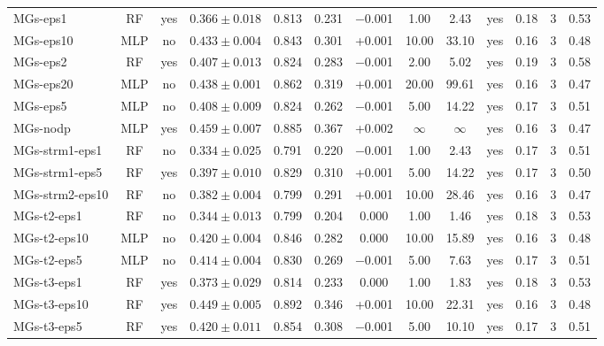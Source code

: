 \begin{landscape}
\begin{longtable}{lccccccccccc c}
MGs-eps1 & RF & yes & $0.366 \pm 0.018$ & 0.813 & 0.231 & $-$0.001 & 1.00 & 2.43 & yes & 0.18 & 3 & 0.53 \\
MGs-eps10 & MLP & no & $0.433 \pm 0.004$ & 0.843 & 0.301 & +0.001 & 10.00 & 33.10 & yes & 0.16 & 3 & 0.48 \\
MGs-eps2 & RF & yes & $0.407 \pm 0.013$ & 0.824 & 0.283 & $-$0.001 & 2.00 & 5.02 & yes & 0.19 & 3 & 0.58 \\
MGs-eps20 & MLP & no & $0.438 \pm 0.001$ & 0.862 & 0.319 & +0.001 & 20.00 & 99.61 & yes & 0.16 & 3 & 0.47 \\
MGs-eps5 & MLP & no & $0.408 \pm 0.009$ & 0.824 & 0.262 & $-$0.001 & 5.00 & 14.22 & yes & 0.17 & 3 & 0.51 \\
MGs-nodp & MLP & yes & $0.459 \pm 0.007$ & 0.885 & 0.367 & +0.002 & $\infty$ & $\infty$ & yes & 0.16 & 3 & 0.47 \\
MGs-strm1-eps1 & RF & no & $0.334 \pm 0.025$ & 0.791 & 0.220 & $-$0.001 & 1.00 & 2.43 & yes & 0.17 & 3 & 0.51 \\
MGs-strm1-eps5 & RF & yes & $0.397 \pm 0.010$ & 0.829 & 0.310 & +0.001 & 5.00 & 14.22 & yes & 0.17 & 3 & 0.50 \\
MGs-strm2-eps10 & RF & no & $0.382 \pm 0.004$ & 0.799 & 0.291 & +0.001 & 10.00 & 28.46 & yes & 0.16 & 3 & 0.47 \\
MGs-t2-eps1 & RF & no & $0.344 \pm 0.013$ & 0.799 & 0.204 & 0.000 & 1.00 & 1.46 & yes & 0.18 & 3 & 0.53 \\
MGs-t2-eps10 & MLP & no & $0.420 \pm 0.004$ & 0.846 & 0.282 & 0.000 & 10.00 & 15.89 & yes & 0.16 & 3 & 0.48 \\
MGs-t2-eps5 & MLP & no & $0.414 \pm 0.004$ & 0.830 & 0.269 & $-$0.001 & 5.00 & 7.63 & yes & 0.17 & 3 & 0.51 \\
MGs-t3-eps1 & RF & yes & $0.373 \pm 0.029$ & 0.814 & 0.233 & 0.000 & 1.00 & 1.83 & yes & 0.18 & 3 & 0.53 \\
MGs-t3-eps10 & RF & yes & $0.449 \pm 0.005$ & 0.892 & 0.346 & +0.001 & 10.00 & 22.31 & yes & 0.16 & 3 & 0.48 \\
MGs-t3-eps5 & RF & yes & $0.420 \pm 0.011$ & 0.854 & 0.308 & $-$0.001 & 5.00 & 10.10 & yes & 0.17 & 3 & 0.51 \\
\end{longtable}
\end{landscape}
